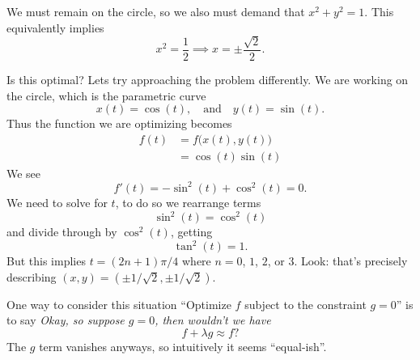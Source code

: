 \M
We must remain on the circle, so we also must demand that
$x^{2}+y^{2}=1$. This equivalently implies
\begin{equation}
x^{2}=\frac{1}{2}\implies x=\pm\frac{\sqrt{2}}{2}.
\end{equation}

\M
Is this optimal? Lets try approaching the problem differently. We
are working on the circle, which is the parametric curve
\begin{equation}
x(t) = \cos(t),\quad\mbox{and}\quad
y(t) = \sin(t).
\end{equation}
Thus the function we are optimizing becomes
\begin{equation}
\begin{aligned}
f(t) &= f\bigl(x(t),y(t)\bigr)\\
&=\cos(t)\sin(t)
\end{aligned}
\end{equation}
We see
\begin{equation}
f'(t) = -\sin^{2}(t)+\cos^{2}(t) = 0.
\end{equation}
We need to solve for $t$, to do so we rearrange terms
\begin{equation}
\sin^{2}(t)=\cos^{2}(t)
\end{equation}
and divide through by $\cos^{2}(t)$, getting
\begin{equation}
\tan^{2}(t) = 1.
\end{equation}
But this implies $t=(2n+1)\pi/4$ where $n=0$, $1$, $2$, or
$3$. Look: that's precisely describing
$(x,y)=(\pm1/\sqrt{2},\pm1/\sqrt{2})$. 


One way to consider this situation ``Optimize $f$ subject to the
constraint $g=0$'' is to say \emph{Okay, so suppose $g=0$, then
wouldn't we have}
\begin{equation}
f + \lambda g\approx f?
\end{equation}
The $g$ term vanishes anyways, so intuitively it seems ``equal-ish''.

